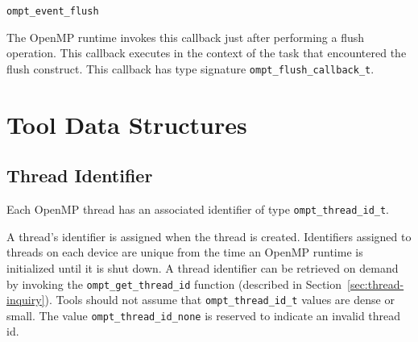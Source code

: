 \documentclass{article}
\newcommand{\descheader}[1]{{\needspace{3\baselineskip}\vspace{1em}\noindent \fbox{#1}}}
\begin{document}
\descheader{Miscellaneous}

\begin{description}

\item \verb|ompt_event_flush|

 \sloppy
   The OpenMP runtime invokes this callback just after
   performing a flush operation.  This callback executes in the
   context of the task that encountered the flush construct.
   This callback has type signature \verb|ompt_flush_callback_t|. 

\end{description}

\section{Tool Data Structures}
\label{sec:data}

\subsection{Thread Identifier}
  Each OpenMP thread  has an associated identifier of type \verb|ompt_thread_id_t|. 

  A thread's identifier is assigned when the thread is created. Identifiers assigned to threads on each device are unique from the time an 
  OpenMP runtime is initialized until it is shut down. 
  A thread identifier can be retrieved
  on demand by invoking the  \verb|ompt_get_thread_id|   
  function (described in Section~\ref{sec:thread-inquiry}).
  Tools should not assume that \verb|ompt_thread_id_t| values are dense or small. 
  The value \verb|ompt_thread_id_none| is reserved to indicate an invalid thread id.
\end{document}
